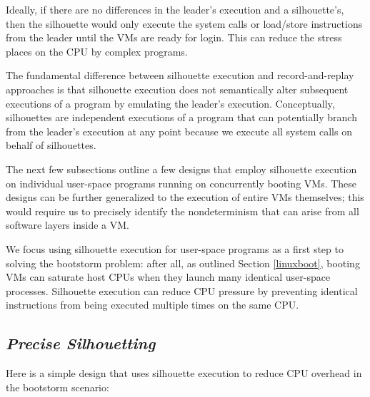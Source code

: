 Ideally, if there are no differences in the leader's
execution and a silhouette's, then the silhouette would only
execute the system calls or load/store instructions
from the leader until the VMs are ready for login.
This can reduce the stress places on the CPU by
complex programs.

The fundamental difference
between silhouette execution and record-and-replay
approaches is that silhouette execution
does not semantically alter subsequent executions
of a program by emulating the leader's execution. 
Conceptually, silhouettes are independent executions of a program
that can potentially branch from the leader's execution at any point
because we execute all system calls on behalf of silhouettes.

The next few subsections outline a few
designs that employ silhouette execution
on individual user-space programs
running on concurrently booting VMs.
These designs can be further generalized to the execution of entire
VMs themselves; this would require us to precisely
identify the nondeterminism that can
arise from all software layers inside a VM.

We focus using silhouette execution for user-space programs as 
a first step to solving the bootstorm problem: after all, as outlined
Section \ref{linuxboot}, booting VMs
can saturate host CPUs when they launch many
identical user-space processes. Silhouette
execution can reduce
CPU pressure by preventing
identical instructions from being
executed multiple times on the same CPU.

\subsection{{\em Precise Silhouetting}}\label{precise:sil}
Here is a simple design that uses silhouette execution 
to reduce CPU overhead in the bootstorm scenario: 

